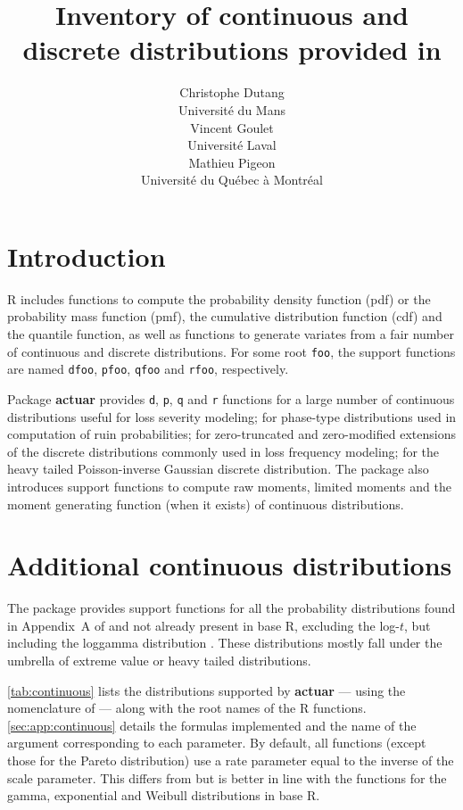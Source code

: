 \documentclass[x11names]{article}
\title{Inventory of continuous and discrete distributions provided
    in \pkg{actuar}}
\author{Christophe Dutang \\ Université du Mans \\[3ex]
    Vincent Goulet \\ Université Laval \\[3ex]
    Mathieu Pigeon \\ Université du Québec à Montréal}
\date{}
\newcommand{\proglang}[1]{\textsf{#1}}
\newcommand{\pkg}[1]{\textbf{#1}}
\newcommand{\code}[1]{\texttt{#1}}
\begin{document}
\maketitle

\section{Introduction}
\label{sec:introduction}

\proglang{R} includes functions to compute the probability density
function (pdf) or the probability mass function (pmf), the cumulative
distribution function (cdf) and the quantile function, as well as
functions to generate variates from a fair number of continuous and
discrete distributions. For some root \code{foo}, the support
functions are named \code{dfoo}, \code{pfoo}, \code{qfoo} and
\code{rfoo}, respectively.

Package \pkg{actuar} provides \code{d}, \code{p}, \code{q} and
\code{r} functions for a large number of continuous distributions
useful for loss severity modeling; for phase-type distributions used
in computation of ruin probabilities; for zero-truncated and
zero-modified extensions of the discrete distributions commonly used
in loss frequency modeling; for the heavy tailed Poisson-inverse
Gaussian discrete distribution. The package also introduces support
functions to compute raw moments, limited moments and the moment
generating function (when it exists) of continuous distributions.


\section{Additional continuous distributions}
\label{sec:continuous}

The package provides support functions for all the probability
distributions found in Appendix~A of \cite{LossModels4e} and not
already present in base \proglang{R}, excluding the log-$t$, but
including the loggamma distribution \citep{HoggKlugman}. These
distributions mostly fall under the umbrella of extreme value or
heavy tailed distributions.

\autoref{tab:continuous} lists the distributions supported by
\pkg{actuar} --- using the nomenclature of \cite{LossModels4e} ---
along with the root names of the \proglang{R} functions.
\autoref{sec:app:continuous} details the formulas implemented and the
name of the argument corresponding to each parameter. By default, all
functions (except those for the Pareto distribution) use a rate
parameter equal to the inverse of the scale parameter. This differs
from \cite{LossModels4e} but is better in line with the functions for
the gamma, exponential and Weibull distributions in base \proglang{R}.
\end{document}
